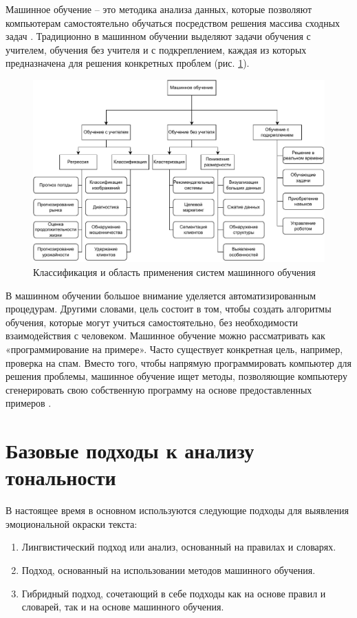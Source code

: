 \documentclass[a4paper,14pt, unknownkeysallowed]{extreport}
\begin{document}
Машинное обучение -- это методика анализа данных, которые позволяют компьютерам самостоятельно обучаться посредством решения массива сходных задач \cite{Poletaeva}. Традиционно в машинном обучении выделяют задачи обучения с учителем, обучения без учителя и с подкреплением, каждая из которых предназначена для решения конкретных проблем (рис. \ref{ml_classes}).

\begin{figure}[H]
	\centering
	\includegraphics[scale=0.85]{imgs/ml_classes.pdf}
	\caption{Классификация и область применения систем машинного обучения}
	\label{ml_classes}
\end{figure}

В машинном обучении большое внимание уделяется автоматизированным процедурам. Другими словами, цель состоит в том, чтобы создать алгоритмы обучения, которые могут учиться самостоятельно, без необходимости взаимодействия с человеком. Машинное обучение можно рассматривать как «программирование на примере». Часто существует конкретная цель, например, проверка на спам. Вместо того, чтобы напрямую программировать компьютер для решения проблемы, машинное обучение ищет методы, позволяющие компьютеру сгенерировать свою собственную программу на основе предоставленных примеров \cite{Alhanov}.


\section{Базовые подходы к анализу тональности}

В настоящее время в основном используются следующие подходы для выявления эмоциональной окраски текста:
\begin{enumerate}
	\item Лингвистический подход или анализ, основанный на правилах и словарях. 
	\item Подход, основанный на использовании методов машинного обучения. 
	\item Гибридный подход, сочетающий в себе подходы как на основе правил и словарей, так и на основе машинного обучения. 
\end{enumerate}	
\end{document}
